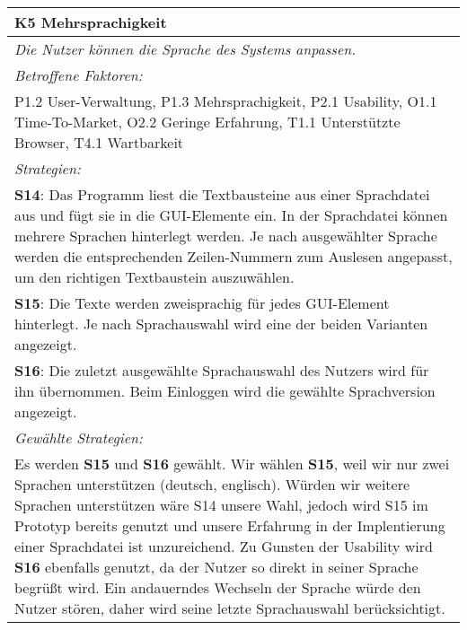 {%
\begin{center}
\begin{minipage}{\linewidth}
    \centering
\renewcommand{\arraystretch}{1.5}
\begin{tabular}{|>{\centering\arraybackslash}p{15cm}|}
            \hline
           \textbf{K5 Mehrsprachigkeit}\\ \hline
            \label{K5}
            \textit{Die Nutzer können die Sprache des Systems anpassen.}\\ \hline
            \textit{Betroffene Faktoren:} \\ 
P1.2 User-Verwaltung, P1.3 Mehrsprachigkeit, P2.1 Usability, O1.1 Time-To-Market, O2.2 Geringe Erfahrung, T1.1 Unterstützte Browser,  T4.1 Wartbarkeit \\
\hline
	      \textit{Strategien:} \\
	\textbf{S14}: Das Programm liest die Textbausteine aus einer Sprachdatei aus und fügt sie in die GUI-Elemente ein. In der Sprachdatei können mehrere Sprachen hinterlegt werden. Je nach ausgewählter Sprache werden die entsprechenden Zeilen-Nummern  zum Auslesen angepasst, um den richtigen Textbaustein auszuwählen. \\
	\textbf{S15}: Die Texte werden zweisprachig für jedes GUI-Element hinterlegt. Je nach Sprachauswahl wird eine der beiden Varianten angezeigt. \\
	\textbf{S16}: Die zuletzt ausgewählte Sprachauswahl des Nutzers wird für ihn übernommen. Beim Einloggen wird die gewählte Sprachversion angezeigt.
\\ \hline
	      \textit{Gewählte Strategien:}\\
Es werden \textbf{S15} und \textbf{S16} gewählt. Wir wählen \textbf{S15}, weil wir nur zwei Sprachen unterstützen (deutsch, englisch). Würden wir weitere Sprachen unterstützen wäre S14 unsere Wahl, jedoch wird S15 im Prototyp bereits genutzt und unsere Erfahrung in der Implentierung einer Sprachdatei ist unzureichend. Zu Gunsten der Usability wird \textbf{S16} ebenfalls genutzt, da der Nutzer so direkt in seiner Sprache begrüßt wird. Ein andauerndes Wechseln der Sprache würde den Nutzer stören, daher wird seine letzte Sprachauswahl berücksichtigt.
 \\ \hline
        \end{tabular}
\end{minipage}
\end{center}

}
